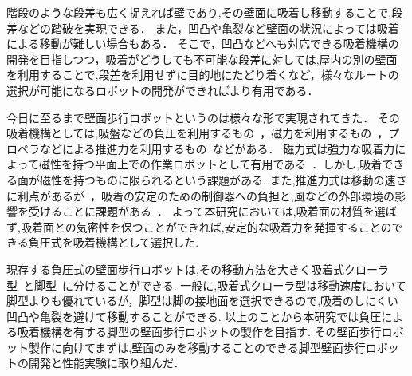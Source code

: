 階段のような段差も広く捉えれば壁であり,その壁面に吸着し移動することで,段差などの踏破を実現できる．
また，凹凸や亀裂など壁面の状況によっては吸着による移動が難しい場合もある．
そこで，凹凸などへも対応できる吸着機構の開発を目指しつつ，吸着がどうしても不可能な段差に対しては,屋内の別の壁面を利用することで,段差を利用せずに目的地にたどり着くなど，様々なルートの選択が可能になるロボットの開発ができればより有用である．

今日に至るまで壁面歩行ロボットというのは様々な形で実現されてきた．
その吸着機構としては,吸盤などの負圧を利用するもの~\cite{広瀬茂男1991四足壁面移動ロボット}，磁力を利用するもの~\cite{高田洋吾2013立体的な環境で活動できる橋梁検査ロボットの開発}，プロペラなどによる推進力を利用するもの~\cite{weko_4205_1}などがある．
磁力式は強力な吸着力によって磁性を持つ平面上での作業ロボットとして有用である~\cite{高田洋吾2013立体的な環境で活動できる橋梁検査ロボットの開発}．しかし,吸着できる面が磁性を持つものに限られるという課題がある.
また,推進力式は移動の速さに利点があるが~\cite{weko_4205_1}，吸着の安定のための制御器への負担と,風などの外部環境の影響を受けることに課題がある~\cite{西亮1991推進力による壁面移動ロボットの研究,鈴木隆宏2009g1501}．
よって本研究においては,吸着面の材質を選ばず,吸着面との気密性を保つことができれば,安定的な吸着力を発揮することのできる負圧式を吸着機構として選択した.

現存する負圧式の壁面歩行ロボットは,その移動方法を大きく吸着式クローラ型~\cite{福田敏男1994壁面走行ロボットの研究}と脚型~\cite{広瀬茂男1991四足壁面移動ロボット}に分けることができる.
一般に,吸着式クローラ型は移動速度において脚型よりも優れているが\cite{福田敏男1992壁面走行ロボッ}，脚型は脚の接地面を選択できるので,吸着のしにくい凹凸や亀裂を避けて移動することができる.
以上のことから本研究では負圧による吸着機構を有する脚型の壁面歩行ロボットの製作を目指す.
その壁面歩行ロボット製作に向けてまずは,壁面のみを移動することのできる脚型壁面歩行ロボットの開発と性能実験に取り組んだ．




